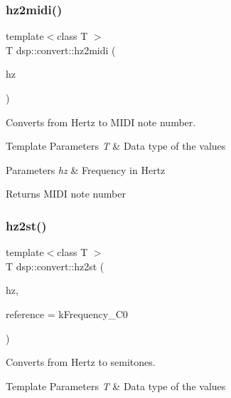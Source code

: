 \subsubsection{\texorpdfstring{hz2midi()}{hz2midi()}}
{\footnotesize\ttfamily template$<$class T $>$ \\
T dsp\+::convert\+::hz2midi (\begin{DoxyParamCaption}\item[{T}]{hz }\end{DoxyParamCaption})}



Converts from Hertz to M\+I\+DI note number. 


\begin{DoxyTemplParams}{Template Parameters}
{\em T} & Data type of the values \\
\hline
\end{DoxyTemplParams}

\begin{DoxyParams}{Parameters}
{\em hz} & Frequency in Hertz \\
\hline
\end{DoxyParams}
\begin{DoxyReturn}{Returns}
M\+I\+DI note number 
\end{DoxyReturn}
\mbox{\label{namespacedsp_1_1convert_afe8c6f4bf884c693174872e42be3299e}} 
\subsubsection{\texorpdfstring{hz2st()}{hz2st()}}
{\footnotesize\ttfamily template$<$class T $>$ \\
T dsp\+::convert\+::hz2st (\begin{DoxyParamCaption}\item[{T}]{hz,  }\item[{T}]{reference = {\ttfamily kFrequency\+\_\+C0} }\end{DoxyParamCaption})}



Converts from Hertz to semitones. 


\begin{DoxyTemplParams}{Template Parameters}
{\em T} & Data type of the values \\
\hline
\end{DoxyTemplParams}

